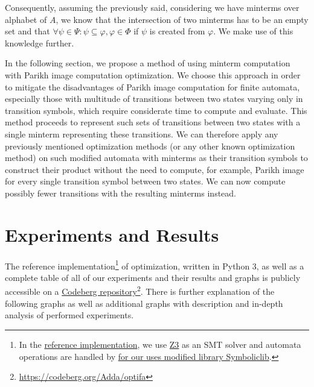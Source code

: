 Consequently, assuming the previously said, considering we have minterms over alphabet of $A$, we know that the intersection of two minterms has to be an empty set and that $\forall \psi \in \Psi: \psi \subseteq \varphi, \varphi \in \Phi$ if $\psi$ is created from $\varphi$. We make use of this knowledge further.

In the following section, we propose a method of using minterm computation with Parikh image computation optimization. We choose this approach in order to mitigate the disadvantages of Parikh image computation for finite automata, especially those with multitude of transitions between two states varying only in transition symbols, which require considerate time to compute and evaluate. This method proceeds to represent such sets of transitions between two states with a single minterm representing these transitions. We can therefore apply any previously mentioned optimization methods (or any other known optimization method) on such modified automata with minterms as their transition symbols to construct their product without the need to compute, for example, Parikh image for every single transition symbol between two states. We can now compute possibly fewer transitions with the resulting minterms instead.




\chapter{Experiments and Results}\label{experimentsAndResultsChapter}

The reference implementation\footnote{In the \href{https://codeberg.org/Adda/optifa}{reference implementation}, we use \href{https://github.com/Z3Prover/z3}{Z3} as an SMT solver and automata operations are handled by \href{https://codeberg.org/Adda/symboliclib}{for our uses modified library Symboliclib}.} of optimization, written in Python 3, as well as a complete table of all of our experiments and their results and graphs is publicly accessible on a \href{https://codeberg.org/Adda/optifa}{Codeberg repository}\footnote{{\href{https://codeberg.org/Adda/optifa}{https://codeberg.org/Adda/optifa}}}. There is further explanation of the following graphs as well as additional graphs with description and in-depth analysis of performed experiments.

